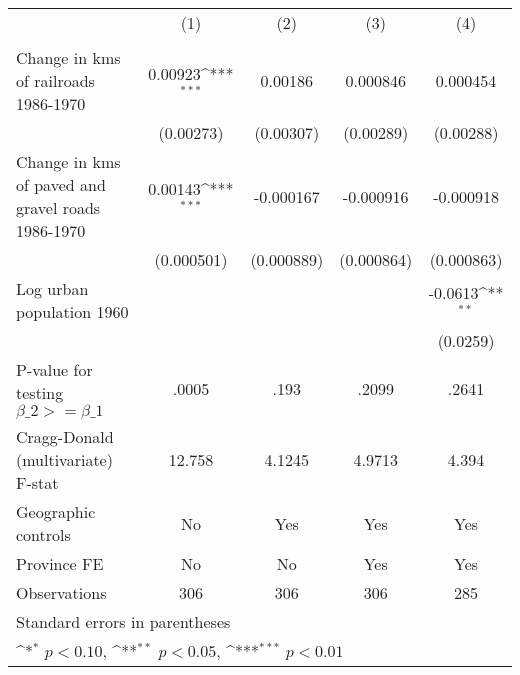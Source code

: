 {
\def\sym#1{\ifmmode^{#1}\else\(^{#1}\)\fi}
\begin{tabular}{l*{4}{c}}
\hline\hline
                &\multicolumn{1}{c}{(1)}&\multicolumn{1}{c}{(2)}&\multicolumn{1}{c}{(3)}&\multicolumn{1}{c}{(4)}\\
                &\multicolumn{1}{c}{}&\multicolumn{1}{c}{}&\multicolumn{1}{c}{}&\multicolumn{1}{c}{}\\
\hline
Change in kms of railroads 1986-1970&  0.00923\sym{***}&  0.00186         & 0.000846         & 0.000454         \\
                &(0.00273)         &(0.00307)         &(0.00289)         &(0.00288)         \\
[1em]
Change in kms of paved and gravel roads 1986-1970&  0.00143\sym{***}&-0.000167         &-0.000916         &-0.000918         \\
                &(0.000501)         &(0.000889)         &(0.000864)         &(0.000863)         \\
[1em]
Log urban population 1960&                  &                  &                  &  -0.0613\sym{**} \\
                &                  &                  &                  & (0.0259)         \\
\hline
P-value for testing $\beta\_{2} >= \beta\_{1}$&    .0005         &     .193         &    .2099         &    .2641         \\
Cragg-Donald (multivariate) F-stat&   12.758         &   4.1245         &   4.9713         &    4.394         \\
Geographic controls&       No         &      Yes         &      Yes         &      Yes         \\
Province FE     &       No         &       No         &      Yes         &      Yes         \\
Observations    &      306         &      306         &      306         &      285         \\
\hline\hline
\multicolumn{5}{l}{\footnotesize Standard errors in parentheses}\\
\multicolumn{5}{l}{\footnotesize \sym{*} \(p<0.10\), \sym{**} \(p<0.05\), \sym{***} \(p<0.01\)}\\
\end{tabular}
}
